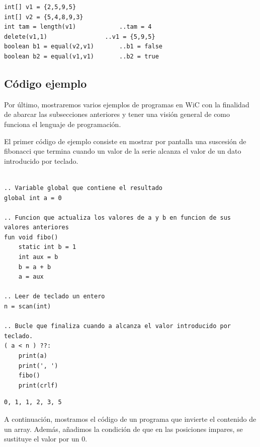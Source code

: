 \documentclass[11pt, english]{article}
\begin{document}
\begin{lstlisting}[caption=Ejemplo de uso de funciones primitivas para arrays numéricos]
int[] v1 = {2,5,9,5}
int[] v2 = {5,4,8,9,3}
int tam = length(v1)			..tam = 4
delete(v1,1)				..v1 = {5,9,5}
boolean b1 = equal(v2,v1)		..b1 = false
boolean b2 = equal(v1,v1)		..b2 = true
\end{lstlisting}


\subsection{Código ejemplo}\label{example-code}
Por último, mostraremos varios ejemplos de programas en WiC con la finalidad de abarcar las subsecciones anteriores y tener una visión general de como funciona el lenguaje de programación.

\vspace{5mm}
El primer código de ejemplo consiste en mostrar por pantalla una suscesión de fibonacci que termina cuando un valor de la serie alcanza el valor de un dato introducido por teclado.

\begin{lstlisting}[caption=Ejemplo de la función Fibonacci con parametros introducidos.]

.. Variable global que contiene el resultado
global int a = 0

.. Funcion que actualiza los valores de a y b en funcion de sus valores anteriores
fun void fibo()
	static int b = 1
	int aux = b
	b = a + b
	a = aux
	
.. Leer de teclado un entero
n = scan(int)

.. Bucle que finaliza cuando a alcanza el valor introducido por teclado.
( a < n ) ??:
	print(a)
	print(', ')
	fibo()
	print(crlf)

\end{lstlisting}

\begin{lstlisting}[caption=Salida en consola para '' n -> \  6 ''.]
 0, 1, 1, 2, 3, 5
\end{lstlisting}
\vspace{5mm}
A continuación, mostramos el código de un programa que invierte el contenido de un array. Además, añadimos la condición de que en las posiciones impares, se sustituye el valor por un 0.
\end{document}
